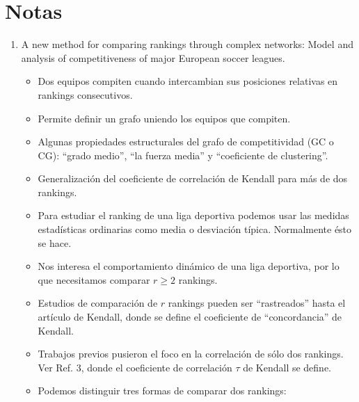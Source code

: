 \section{Notas}

\begin{enumerate}
\item A new method for comparing rankings through complex networks: Model and analysis of competitiveness of major European soccer leagues.
	\begin{itemize}
		\item Dos equipos compiten cuando intercambian sus posiciones relativas en rankings consecutivos.
		\item Permite definir un grafo uniendo los equipos que compiten.
		\item Algunas propiedades estructurales del grafo de competitividad (GC o CG): ``grado medio'', ``la fuerza media'' y ``coeficiente de clustering''.
		\item Generalización del coeficiente de correlación de Kendall para más de dos rankings.
		\item Para estudiar el ranking de una liga deportiva podemos usar las medidas estadísticas ordinarias como media o desviación típica. Normalmente ésto se hace.
		\item Nos interesa el comportamiento dinámico de una liga deportiva, por lo que necesitamos comparar $r \geq 2$ rankings. 
		\item Estudios de comparación de $r$ rankings pueden ser ``rastreados'' hasta el artículo de Kendall, donde se define el coeficiente de ``concordancia'' de Kendall. 
		\item Trabajos previos pusieron el foco en la correlación de sólo dos rankings. Ver Ref. 3, donde el coeficiente de correlación $\tau$ de Kendall se define. 
		\item Podemos distinguir tres formas de comparar dos rankings:
		

\end{itemize}
\end{enumerate}

